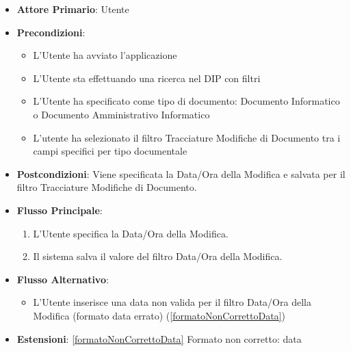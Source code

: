 \begin{itemize}
      \item \textbf{Attore Primario}: Utente
      \item \textbf{Precondizioni}: 
      \begin{itemize}            
            \item L'Utente ha avviato l'applicazione
            \item L'Utente sta effettuando una ricerca nel DIP con filtri
            \item L'Utente ha specificato come tipo di documento: Documento Informatico o Documento Amministrativo Informatico
            \item L'utente ha selezionato il filtro Tracciature Modifiche di Documento tra i campi specifici per tipo documentale
      \end{itemize}
      \item \textbf{Postcondizioni}: Viene specificata la Data/Ora della Modifica e salvata per il filtro Tracciature Modifiche di Documento.
      \item \textbf{Flusso Principale}:
            \begin{enumerate}
                  \item L'Utente specifica la Data/Ora della Modifica.
                  \item Il sistema salva il valore del filtro Data/Ora della Modifica.
            \end{enumerate}
      \item \textbf{Flusso Alternativo}:
      \begin{itemize}
            \item L'Utente inserisce una data non valida per il filtro Data/Ora della Modifica (formato data errato) (\ref{formatoNonCorrettoData})
      \end{itemize}
      \item \textbf{Estensioni}: \ref{formatoNonCorrettoData} Formato non corretto: data
\end{itemize}

